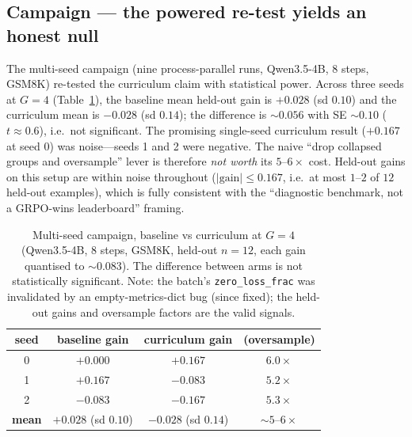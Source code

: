 \documentclass[12pt,a4paper]{report}
\begin{document}
\subsection{Campaign --- the powered re-test yields an honest null}

The multi-seed campaign (nine process-parallel runs, Qwen3.5-4B, 8 steps, GSM8K)
re-tested the curriculum claim with statistical power. Across three seeds at
$G{=}4$ (Table~\ref{tab:campaign}), the baseline mean held-out gain is
$+0.028$ (sd $0.10$) and the curriculum mean is $-0.028$ (sd $0.14$); the
difference is ${\sim}0.056$ with SE ${\sim}0.10$ ($t\approx0.6$), i.e.\ not
significant. The promising single-seed curriculum result ($+0.167$ at seed 0) was
noise---seeds 1 and 2 were negative. The naive ``drop collapsed groups and
oversample'' lever is therefore \emph{not worth} its $5$--$6\times$ cost. Held-out
gains on this setup are within noise throughout ($|\text{gain}|\le0.167$, i.e.\ at
most $1$--$2$ of $12$ held-out examples), which is fully consistent with the
``diagnostic benchmark, not a GRPO-wins leaderboard'' framing.

\begin{table}[t]
\centering
\small
\begin{tabular}{@{}cccc@{}}
\toprule
seed & baseline gain & curriculum gain & (oversample) \\
\midrule
0 & $+0.000$ & $+0.167$ & $6.0\times$ \\
1 & $+0.167$ & $-0.083$ & $5.2\times$ \\
2 & $-0.083$ & $-0.167$ & $5.3\times$ \\
\midrule
\textbf{mean} & $\mathbf{+0.028}$ (sd $0.10$) & $\mathbf{-0.028}$ (sd $0.14$) & ${\sim}5$--$6\times$ \\
\bottomrule
\end{tabular}
\caption{Multi-seed campaign, baseline vs curriculum at $G{=}4$ (Qwen3.5-4B,
8 steps, GSM8K, held-out $n=12$, each gain quantised to ${\sim}0.083$). The
difference between arms is not statistically significant. Note: the batch's
\texttt{zero\_loss\_frac} was invalidated by an empty-metrics-dict bug (since
fixed); the held-out gains and oversample factors are the valid signals.}
\label{tab:campaign}
\end{table}
\end{document}
